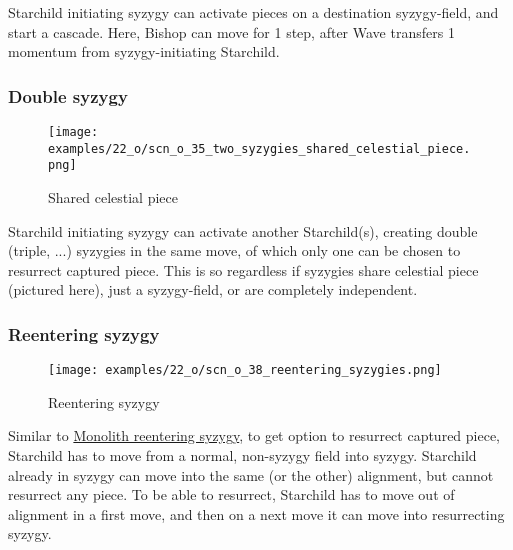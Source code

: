 Starchild initiating syzygy can activate pieces on a destination syzygy-field, and start
a cascade. Here, Bishop can move for 1 step, after Wave transfers 1 momentum from
syzygy-initiating Starchild.

\clearpage %

\subsubsection*{Double syzygy}

\vspace*{-1.2\baselineskip}
\noindent
\begin{figure}[!h]
\texttt{[image: examples/22\_o/scn\_o\_35\_two\_syzygies\_shared\_celestial\_piece.png]}
\caption{Shared celestial piece}
\label{fig:scn_o_35_two_syzygies_shared_celestial_piece}
\end{figure}

Starchild initiating syzygy can activate another Starchild(s), creating double (triple,
...) syzygies in the same move, of which only one can be chosen to resurrect captured
piece. This is so regardless if syzygies share celestial piece (pictured here), just a
syzygy-field, or are completely independent.

\clearpage %

\subsubsection*{Reentering syzygy}

\vspace*{-1.2\baselineskip}
\noindent
\begin{figure}[!h]
\texttt{[image: examples/22\_o/scn\_o\_38\_reentering\_syzygies.png]}
\caption{Reentering syzygy}
\label{fig:scn_o_38_reentering_syzygies}
\end{figure}

Similar to
\hyperref[fig:scn_d_23_syzygy_reentering_same_move]{Monolith reentering syzygy}, to
get option to resurrect captured piece, Starchild has to move from a normal, non-syzygy
field into syzygy. Starchild already in syzygy can move into the same (or the other)
alignment, but cannot resurrect any piece. To be able to resurrect, Starchild has to
move out of alignment in a first move, and then on a next move it can move into
resurrecting syzygy.

